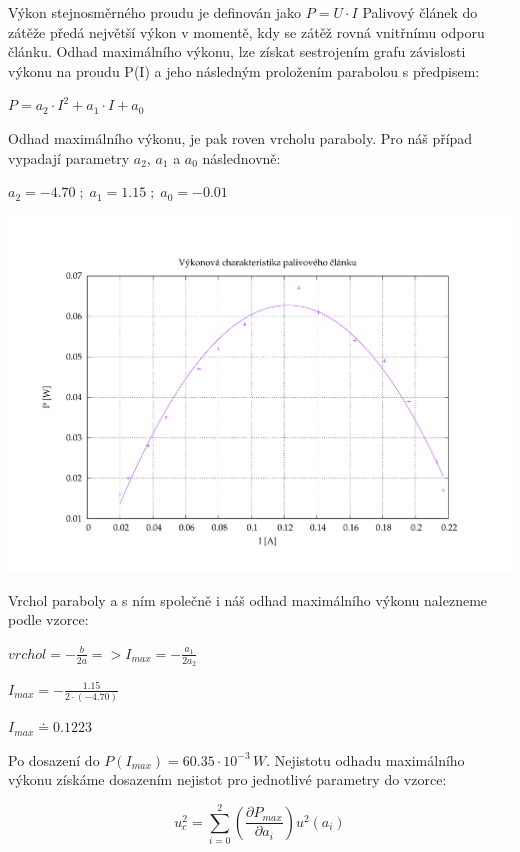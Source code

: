 \documentclass[11pt, a4paper]{report}
\begin{document}
\clearpage
\noindent
Výkon stejnosměrného proudu je definován jako {\boldmath $P = U \cdot I$}
Palivový článek do zátěže předá největší výkon v momentě, kdy se zátěž rovná vnitřnímu odporu článku.
Odhad maximálního výkonu, lze získat sestrojením grafu závislosti výkonu na proudu P(I) a jeho následným proložením parabolou s předpisem:
\begin{center}
	\Large
	$P = a_2 \cdot I^2 +a_1 \cdot I + a_0$
\end{center}
\large
Odhad maximálního výkonu, je pak roven vrcholu paraboly. Pro náš případ vypadají parametry {\boldmath $a_2$, $a_1$ a $a_0$} následnovně:

\begin{center}
	\Large
	$a_2 = -4.70\;;\; a_1 = 1.15\;;\; a_0 = -0.01$
\end{center}


\includegraphics[width=1\textwidth, trim=1.5cm 1cm 3cm 1cm, clip]{Vykon_paliv.pdf}

\noindent Vrchol paraboly a s ním společně i náš odhad maximálního výkonu nalezneme podle vzorce:
\begin{center}
	\Large
	$vrchol = -\frac{b}{2a} => I_{max} = -\frac{a_1}{2a_2}$

	\vspace{1pt}
	$I_{max} = -\frac{1.15}{2 \cdot (-4.70)}$

	\vspace{3pt}
	$I_{max} \doteq 0.1223 $
\end{center} 
Po dosazení do $P(I_{max}) = 60.35 \cdot 10^{-3} \,W$. 
\clearpage 
\noindent Nejistotu odhadu maximálního výkonu získáme dosazením nejistot pro jednotlivé parametry do vzorce:
\begin{center}
\Large	
\[u^2_c = \sum_{i=0}^{2}(\frac{\partial P_{max}}{\partial a_i})u^2(a_i)\]
\end{center}
\end{document}
